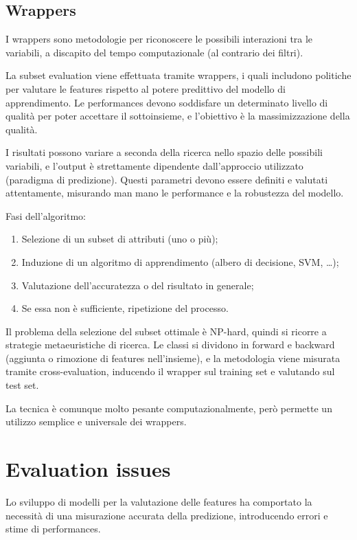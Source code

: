 \subsection{Wrappers}
I wrappers sono metodologie per riconoscere le possibili interazioni tra le variabili, a discapito del tempo computazionale (al contrario dei filtri).

La subset evaluation viene effettuata tramite wrappers, i quali includono 
politiche per valutare le features rispetto al potere predittivo del modello di 
apprendimento. Le performances devono soddisfare un determinato livello 
di qualità per poter accettare il sottoinsieme, e l'obiettivo è la 
massimizzazione della qualità.

I risultati possono variare a seconda della ricerca nello spazio delle possibili variabili, e l'output è strettamente dipendente dall'approccio utilizzato (paradigma di predizione). Questi parametri devono essere definiti e valutati attentamente, misurando man mano le performance e la robustezza del modello.

Fasi dell'algoritmo:
\begin{enumerate}
	\item Selezione di un subset di attributi (uno o più);
	\item Induzione di un algoritmo di apprendimento (albero di decisione, SVM, \dots);
	\item Valutazione dell'accuratezza o del risultato in generale;
	\item Se essa non è sufficiente, ripetizione del processo.
\end{enumerate}

Il problema della selezione del subset ottimale è NP-hard, quindi si ricorre a strategie metaeuristiche di ricerca. Le classi si dividono in forward e backward (aggiunta o rimozione di features nell'insieme), e la metodologia viene misurata tramite cross-evaluation, inducendo il wrapper sul training set e valutando sul test set. 

La tecnica è comunque molto pesante computazionalmente, però permette un utilizzo semplice e universale dei wrappers.

\section{Evaluation issues}
Lo sviluppo di modelli per la valutazione delle features ha comportato la necessità di una misurazione accurata della predizione, introducendo errori e stime di performances.


